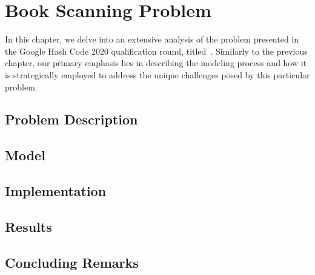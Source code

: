 \chapter{Book Scanning Problem}
\label{ch:book-scanning}


In this chapter, we delve into an extensive analysis of the problem presented in
the Google Hash Code 2020 qualification round,
titled~. Similarly to
the previous chapter, our primary emphasis lies in describing the modeling
process and how it is strategically employed to address the unique challenges
posed by this particular problem.


\section{Problem Description}
\label{sec:bs-problem}


\section{Model}
\label{sec:bs-model}


\section{Implementation}
\label{sec:bs-implementation}


\section{Results}
\label{sec:bs-results}


\section{Concluding Remarks}
\label{sec:bs-concluding-remarks}
